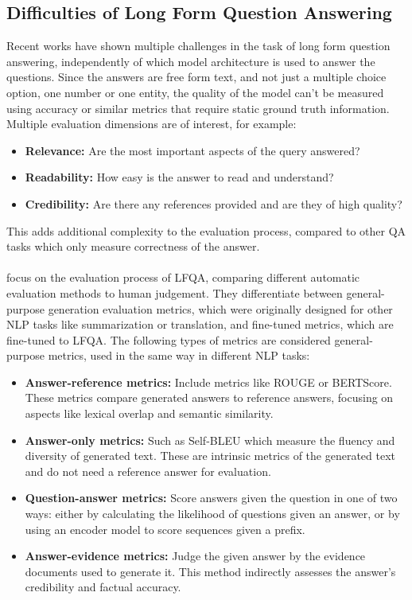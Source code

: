 \subsection{Difficulties of Long Form Question Answering}\label{sec:long-form-qa-difficulties}
Recent works have shown multiple challenges in the task of long form question answering, independently of which model architecture is used to answer the questions.
Since the answers are free form text, and not just a multiple choice option, one number or one entity, the quality of the model can't be measured using accuracy or similar metrics that require static ground truth information.
Multiple evaluation dimensions are of interest, for example:
\begin{itemize}
    \item \textbf{Relevance:} Are the most important aspects of the query answered?
    \item \textbf{Readability:} How easy is the answer to read and understand?
    \item \textbf{Credibility:} Are there any references provided and are they of high quality?
\end{itemize}
This adds additional complexity to the evaluation process, compared to other QA tasks which only measure correctness of the answer.
\\
\\
\cite{xu:2023:A} focus on the evaluation process of LFQA, comparing different automatic evaluation methods to human judgement.
They differentiate between general-purpose generation evaluation metrics, which were originally designed for other NLP tasks like summarization or translation, and fine-tuned metrics, which are fine-tuned to LFQA.
The following types of metrics are considered general-purpose metrics, used in the same way in different NLP tasks:
\begin{itemize}
\item \textbf{Answer-reference metrics:} Include metrics like ROUGE or BERTScore. These metrics compare generated answers to reference answers, focusing on aspects like lexical overlap and semantic similarity.
\item \textbf{Answer-only metrics:} Such as Self-BLEU which measure the fluency and diversity of generated text. These are intrinsic metrics of the generated text and do not need a reference answer for evaluation.
\item \textbf{Question-answer metrics:} Score answers given the question in one of two ways: either by calculating the likelihood of questions given an answer, or by using an encoder model to score sequences given a prefix.
\item \textbf{Answer-evidence metrics:} Judge the given answer by the evidence documents used to generate it. This method indirectly assesses the answer's credibility and factual accuracy.
\end{itemize}

